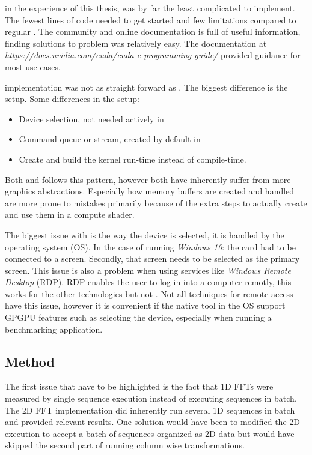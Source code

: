 {\CU} in the experience of this thesis, {\CU} was by far the least complicated to implement. The fewest lines of code needed to get started and few limitations compared to regular {\CPP}. The {\CU} community and online documentation is full of useful information, finding solutions to problem was relatively easy. The documentation at \textit{https://docs.nvidia.com/cuda/cuda-c-programming-guide/} provided guidance for most use cases.

{\OCL} implementation was not as straight forward as {\CU}. The biggest difference is the setup. Some differences in the setup:
\begin{itemize}
	\item Device selection, not needed actively in {\CU}
	\item Command queue or stream, created by default in {\CU}
	\item Create and build the \gls{kernel} run-time instead of compile-time.
\end{itemize}
Both {\DX} and {\GL} follows this pattern, however both have inherently suffer from more graphics abstractions. Especially how memory buffers are created and handled are more prone to mistakes primarily because of the extra steps to actually create and use them in a compute shader.

The biggest issue with {\GL} is the way the device is selected, it is handled by the operating system (OS). In the case of running \emph{Windows 10}: the card had to be connected to a screen. Secondly, that screen needs to be selected as the primary screen. This issue is also a problem when using services like \textit{Windows Remote Desktop} (RDP). RDP enables the user to log in into a computer remotly, this works for the other technologies but not {\GL}. Not all techniques for remote access have this issue, however it is convenient if the native tool in the OS support GPGPU features such as selecting the device, especially when running a benchmarking application.

\subsection{Method}

The first issue that have to be highlighted is the fact that 1D FFTs were measured by single sequence execution instead of executing sequences in batch. The 2D FFT implementation did inherently run several 1D sequences in batch and provided relevant results. One solution would have been to modified the 2D execution to accept a batch of sequences organized as 2D data but would have skipped the second part of running column wise transformations.

